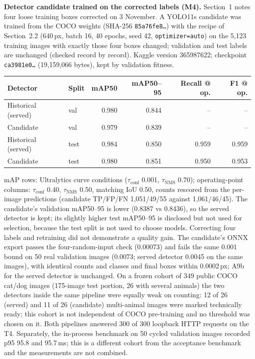 \documentclass[11pt,a4paper]{article}
\newcommand{\tconf}{$\tau_{\text{conf}}$}
\newcommand{\tnms}{$\tau_{\text{NMS}}$}
\begin{document}
\textbf{Detector candidate trained on the corrected labels (M4).} Section~1 notes four loose training boxes corrected on 3 November. A YOLO11s candidate was trained from the COCO weights (SHA-256 \texttt{85a76fe8\ldots}) with the recipe of Section~2.2 (640\,px, batch 16, 40 epochs, seed 42, \texttt{optimizer=auto}) on the 5,123 training images with exactly those four boxes changed; validation and test labels are unchanged (checked record by record). Kaggle version 365987622; checkpoint \texttt{ca3981e0\ldots} (19,159,066 bytes), kept by validation fitness.

\begin{tabularx}{\linewidth}{@{}Y l r r r r@{}}
\toprule
Detector & Split & mAP50 & mAP50--95 & Recall @ op. & F1 @ op. \\
\midrule
Historical (served) & val & 0.980 & 0.844 & -- & -- \\
Candidate & val & 0.979 & 0.839 & -- & -- \\
Historical (served) & test & 0.984 & 0.850 & 0.959 & 0.959 \\
Candidate & test & 0.980 & 0.851 & 0.950 & 0.953 \\
\bottomrule
\end{tabularx}

mAP rows: Ultralytics curve conditions (\tconf{} 0.001, \tnms{} 0.70); operating-point columns: \tconf{} 0.40, \tnms{} 0.50, matching IoU 0.50, counts rescored from the per-image predictions (candidate TP/FP/FN 1,051/49/55 against 1,061/46/45). The candidate's validation mAP50--95 is lower (0.8387 vs 0.8436), so the served detector is kept; its slightly higher test mAP50--95 is disclosed but not used for selection, because the test split is not used to choose models. Correcting four labels and retraining did not demonstrate a quality gain. The candidate's ONNX export passes the four-random-input check (0.00073) and fails the same 0.001 bound on 50 real validation images (0.0073; served detector 0.0045 on the same images), with identical counts and classes and final boxes within 0.0002\,px; A9b for the served detector is unchanged. On a frozen cohort of 349 public COCO cat/dog images (175-image test portion, 26 with several animals) the two detectors inside the same pipeline were equally weak on counting: 12 of 26 (served) and 11 of 26 (candidate) multi-animal images were marked technically ready; this cohort is not independent of COCO pre-training and no threshold was chosen on it. Both pipelines answered 300 of 300 loopback HTTP requests on the T4. Separately, the in-process benchmark on 50 cycled validation images recorded p95 95.8 and 95.7\,ms; this is a different cohort from the acceptance benchmark and the measurements are not combined.
\end{document}
